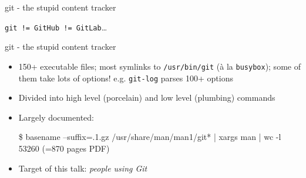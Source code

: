 \begin{frame}{git - the stupid content tracker}
  \begin{center}
    \texttt{git != GitHub != GitLab}\ldots{}\\[4ex]
  \end{center}


\end{frame}

\begin{frame}{git - the stupid content tracker}
  \begin{itemize}
  \item \alert{150+} executable files; most symlinks to \texttt{/usr/bin/git} (à la \texttt{busybox}); some of them take lots of options! e.g. \texttt{git-log} parses 100+ options
  \item Divided into high level (porcelain) and low level (plumbing) commands
  \item Largely documented:\par
    {\ttfamily\small\$ basename --suffix=.1.gz /usr/share/man/man1/git* | xargs man | wc -l\\
      53260} (=870 pages PDF)
  \item Target of this talk: \emph{people using Git}
  \end{itemize}
\end{frame}

